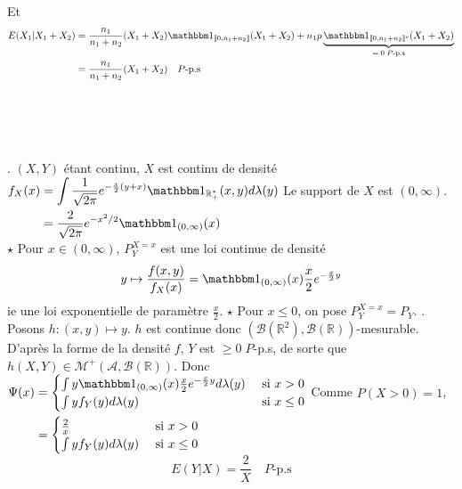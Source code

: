 \documentclass{report}
\begin{document}
Et $$\begin{aligned} E(X_1|X_1+X_2) &= \frac{n_1}{n_1+n_2}(X_1+X_2)\mathbbm 1_{\llbracket 0,n_1+n_2\rrbracket}(X_1+X_2) + n_1p \underbrace{\mathbbm 1_{\llbracket 0,n_1+n_2\rrbracket^c}(X_1+X_2)}_{=\;0 \;P\text{-p.s}} \\
&=\frac{n_1}{n_1+n_2}(X_1+X_2) \quad P\text{-p.s}  \end{aligned}$$


\subsection{} \noindent{}\\ 
\\ 
\\
. $(X,Y)$ étant continu, $X$ est continu de densité $\begin{aligned}[t] f_X(x) &=\int \frac{1}{\sqrt{2\pi}}e^{-\frac{x}{2}(y+x)} \mathbbm 1_{\mathbb R_+^*}(x,y) d\lambda(y) \\
&= \frac{2}{\sqrt{2\pi}}e^{-x^2/2 }\mathbbm 1_{(0,\infty)}(x) 
\end{aligned}$
Le support de $X$ est $(0,\infty)$. \newline
$\star$ Pour $x\in (0,\infty)$, $P_Y^{X=x}$ est une loi continue de densité $$y\mapsto \frac{f(x,y)}{f_X(x)} = \mathbbm 1_{(0,\infty)}(x) \frac{x}{2}e^{-\frac{x}{2}y}$$
ie une loi exponentielle de paramètre $\frac{x}{2}$.\newline
$\star$ Pour $x\leq 0$, on pose $P_Y^{X=x}=P_Y$.\newline 
{}. Posons $h:(x,y)\mapsto y$. $h$ est continue donc $(\mathcal B(\mathbb R^2),\mathcal B(\mathbb R))$-mesurable. D'après la forme de la densité $f$, $Y$ est $\geq 0 \; P$-p.s, de sorte que $h(X,Y)\in \mathcal M^+(\mathcal A,\mathcal B(\mathbb R))$. \newline
Donc $\begin{aligned}[t]\Psi(x)&=\begin{cases}
\int y \mathbbm 1_{(0,\infty)}(x) \frac{x}{2}e^{-\frac{x}{2}y} d\lambda(y) & \text{ si } x>0 \\
\int y f_Y(y) d\lambda(y) & \text{ si } x\leq 0
\end{cases}\\
&= \begin{cases}
\frac 2x & \text{ si } x>0 \\
\int y f_Y(y) d\lambda(y) & \text{ si } x\leq 0
\end{cases}
\end{aligned}$\newline
Comme $P(X>0)=1$, $$E(Y|X)=\frac{2}{X} \quad P\text{-p.s} $$
\end{document}
